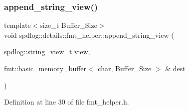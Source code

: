 \subsubsection{\texorpdfstring{append\+\_\+string\+\_\+view()}{append\_string\_view()}}
{\footnotesize\ttfamily template$<$size\+\_\+t Buffer\+\_\+\+Size$>$ \\
void spdlog\+::details\+::fmt\+\_\+helper\+::append\+\_\+string\+\_\+view (\begin{DoxyParamCaption}\item[{\hyperlink{namespacespdlog_af48e310b2f366ac6544701e6a3b56247}{spdlog\+::string\+\_\+view\+\_\+t}}]{view,  }\item[{fmt\+::basic\+\_\+memory\+\_\+buffer$<$ char, Buffer\+\_\+\+Size $>$ \&}]{dest }\end{DoxyParamCaption})\hspace{0.3cm}{\ttfamily [inline]}}



Definition at line 30 of file fmt\+\_\+helper.\+h.

